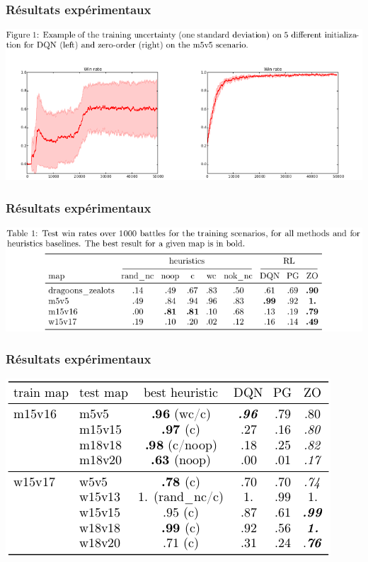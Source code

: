 \documentclass[smaller]{beamer}
\begin{document}
\begin{frame}
  \frametitle{Résultats expérimentaux}

  \centerline{\includegraphics[width=1.1\linewidth]{./figs/results_fig}}

\end{frame}


\begin{frame}
  \frametitle{Résultats expérimentaux}

  \centerline{\includegraphics[width=1.1\linewidth]{./figs/results_tab1}}

\end{frame}


\begin{frame}
  \frametitle{Résultats expérimentaux}

  \centerline{\includegraphics[width=0.7\linewidth]{./figs/results_tab2}}

\end{frame}
\end{document}
